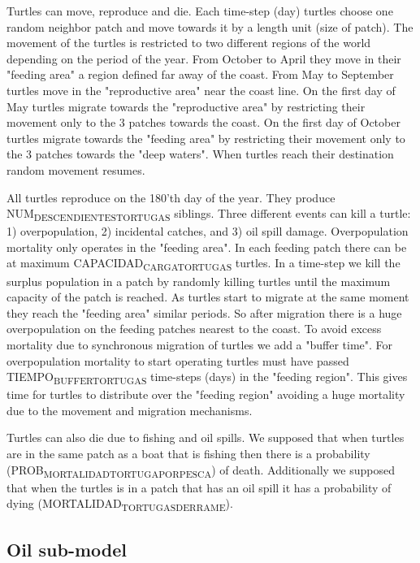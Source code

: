 \documentclass[11pt]{article}
\begin{document}
Turtles can move, reproduce and die. Each time-step (day) turtles choose one random neighbor patch and move towards it by a length unit (size of patch). The movement of the turtles is restricted to two different regions of the world depending on the period of the year. From October to April they move in their "feeding area" a region defined far away of the coast. From May to September turtles move in the "reproductive area" near the coast line. On the first day of May turtles migrate towards the "reproductive area" by restricting their movement only to the 3 patches towards the coast. On the first day of October turtles migrate towards the "feeding area" by restricting their movement only to the 3 patches towards the "deep waters". When turtles reach their destination random movement resumes.

All turtles reproduce on the 180'th day of the year. They produce NUM\textsubscript{DESCENDIENTES}\textsubscript{TORTUGAS} siblings. Three different events can kill a turtle: 1) overpopulation, 2) incidental catches, and 3) oil spill damage. Overpopulation mortality only operates in the "feeding area". In each feeding patch there can be at maximum CAPACIDAD\textsubscript{CARGA}\textsubscript{TORTUGAS} turtles. In a time-step we kill the surplus population in a patch by randomly killing turtles until the maximum capacity of the patch is reached. As turtles start to migrate at the same moment they reach the "feeding area" similar periods. So after migration there is a huge overpopulation on the feeding patches nearest to the coast. To avoid excess mortality due to synchronous migration of turtles we add a "buffer time". For overpopulation mortality to start operating turtles must have passed TIEMPO\textsubscript{BUFFER}\textsubscript{TORTUGAS} time-steps (days) in the "feeding region". This gives time for turtles to distribute over the "feeding region" avoiding a huge mortality due to the movement and migration mechanisms.

Turtles can also die due to fishing and oil spills. We supposed that when turtles are in the same patch as a boat that is fishing then there is a probability (PROB\textsubscript{MORTALIDAD}\textsubscript{TORTUGA}\textsubscript{POR}\textsubscript{PESCA}) of death. Additionally we supposed that when the turtles is in a patch that has an oil spill it has a probability of dying (MORTALIDAD\textsubscript{TORTUGAS}\textsubscript{DERRAME}). 

\subsection{Oil sub-model}
\label{sec:org097ce14}
\end{document}
